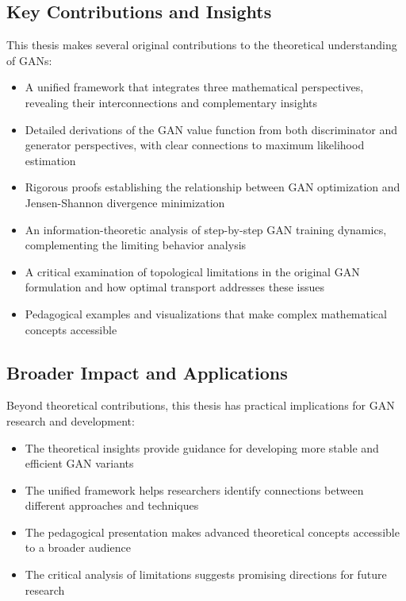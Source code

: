 \subsection*{Key Contributions and Insights}

This thesis makes several original contributions to the theoretical understanding of GANs:

\begin{itemize}
\item A unified framework that integrates three mathematical perspectives, revealing their interconnections and complementary insights
\item Detailed derivations of the GAN value function from both discriminator and generator perspectives, with clear connections to maximum likelihood estimation
\item Rigorous proofs establishing the relationship between GAN optimization and Jensen-Shannon divergence minimization
\item An information-theoretic analysis of step-by-step GAN training dynamics, complementing the limiting behavior analysis
\item A critical examination of topological limitations in the original GAN formulation and how optimal transport addresses these issues
\item Pedagogical examples and visualizations that make complex mathematical concepts accessible
\end{itemize}

\subsection*{Broader Impact and Applications}

Beyond theoretical contributions, this thesis has practical implications for GAN research and development:

\begin{itemize}
\item The theoretical insights provide guidance for developing more stable and efficient GAN variants
\item The unified framework helps researchers identify connections between different approaches and techniques
\item The pedagogical presentation makes advanced theoretical concepts accessible to a broader audience
\item The critical analysis of limitations suggests promising directions for future research
\end{itemize}

